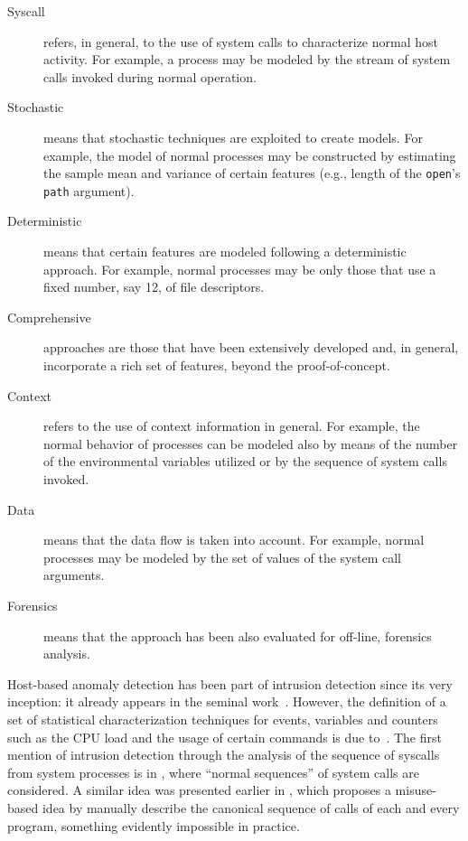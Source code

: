 \documentclass[12pt]{article}
\theoremstyle{definition}
\begin{document}
			\begin{description}
				\item[Syscall] refers, in general, to the use of system calls to
				characterize normal host activity. For example, a process may be
				modeled by the stream of system calls invoked during normal operation.
				\item[Stochastic] means that stochastic techniques are exploited to
				create models. For example, the model of normal processes may be
				constructed by estimating the sample mean and variance of certain
				features (e.g., length of the \texttt{open}'s \texttt{path} argument).
				\item[Deterministic] means that certain features are modeled following
				a deterministic approach. For example, normal processes may be only
				those that use a fixed number, say 12, of file descriptors.
				\item[Comprehensive] approaches are those that have been extensively
				developed and, in general, incorporate a rich set of features, beyond
				the proof-of-concept.
				\item[Context] refers to the use of context information in
				general. For example, the normal behavior of processes can be modeled
				also by means of the number of the environmental variables utilized or
				by the sequence of system calls invoked.
				\item[Data] means that the data flow is taken into account. For
				example, normal processes may be modeled by the set of values of the
				system call arguments.
				\item[Forensics] means that the approach has been also evaluated for
				off-line, forensics analysis.
			\end{description}
			
			
			Host-based anomaly detection has been part of intrusion detection
			since its very inception: it already appears in the seminal
			work~\citep{anderson}. However, the definition of a set of statistical
			characterization techniques for events, variables and counters such as
			the CPU load and the usage of certain commands is due
			to~\citep{denning:tse1987:ides}. The first mention of intrusion
			detection through the analysis of the sequence of syscalls from system
			processes is in \citep{Self}, where ``normal sequences'' of system
			calls are considered. A similar idea was presented earlier in
			\citep{PrivilegedProgramsMonitoring}, which proposes a misuse-based
			idea by manually describe the canonical sequence of calls of each and
			every program, something evidently impossible in practice.
			
\end{document}
